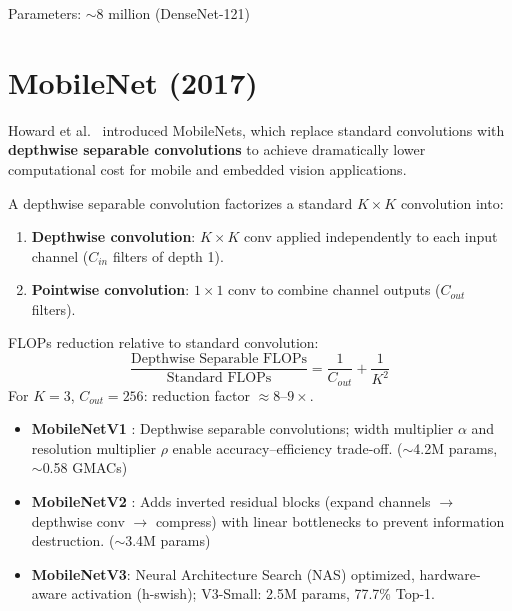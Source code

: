 Parameters: $\sim$8 million (DenseNet-121)

\section{MobileNet (2017)}

Howard et al.\ \cite{howard2017mobilenets} introduced MobileNets, which replace standard convolutions with \textbf{depthwise separable convolutions} to achieve dramatically lower computational cost for mobile and embedded vision applications.

A depthwise separable convolution factorizes a standard $K\times K$ convolution into:
\begin{enumerate}
    \item \textbf{Depthwise convolution}: $K\times K$ conv applied independently to each input channel ($C_{in}$ filters of depth 1).
    \item \textbf{Pointwise convolution}: $1\times1$ conv to combine channel outputs ($C_{out}$ filters).
\end{enumerate}

FLOPs reduction relative to standard convolution:
\begin{equation}
\frac{\text{Depthwise Separable FLOPs}}{\text{Standard FLOPs}} = \frac{1}{C_{out}} + \frac{1}{K^2}
\end{equation}
For $K=3$, $C_{out}=256$: reduction factor $\approx 8$--$9\times$.

\begin{properties}
\begin{itemize}
    \item \textbf{MobileNetV1} \cite{howard2017mobilenets}: Depthwise separable convolutions; width multiplier $\alpha$ and resolution multiplier $\rho$ enable accuracy--efficiency trade-off. ($\sim$4.2M params, $\sim$0.58 GMACs)
    \item \textbf{MobileNetV2} \cite{sandler2018mobilenetv2}: Adds inverted residual blocks (expand channels $\rightarrow$ depthwise conv $\rightarrow$ compress) with linear bottlenecks to prevent information destruction. ($\sim$3.4M params)
    \item \textbf{MobileNetV3}: Neural Architecture Search (NAS) optimized, hardware-aware activation (h-swish); V3-Small: 2.5M params, 77.7\% Top-1.
\end{itemize}
\end{properties}

